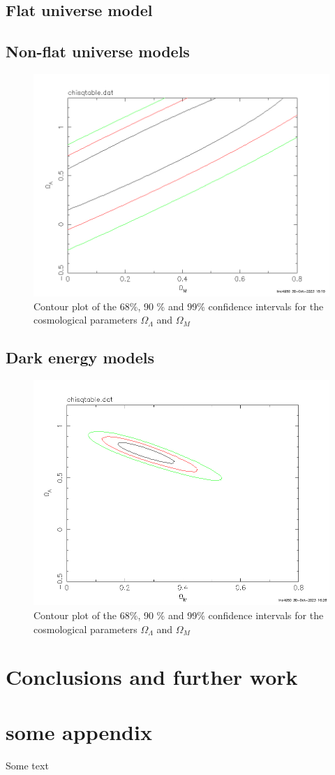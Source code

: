 \documentclass[11pt]{article}
\begin{document}
\subsection{Flat universe model}

\subsection{Non-flat universe models}
\begin{figure}[htbp]
	\centering
	\includegraphics[width=0.8\linewidth]{nonflat.png}
	\caption{Contour plot of the 68\%, 90 \% and 99\% confidence intervals for the cosmological parameters $\Omega_\Lambda$ and $\Omega_M$}
	\label{fig:nonflat}
\end{figure}

\subsection{Dark energy models}
\begin{figure}[htbp]
	\centering
	\includegraphics[width=0.8\linewidth]{dark.png}
	\caption{Contour plot of the 68\%, 90 \% and 99\% confidence intervals for the cosmological parameters $\Omega_\Lambda$ and $\Omega_M$}
	\label{fig:dark}
\end{figure}

\section{Conclusions and further work}




\newpage

\appendix
\section{some appendix} 
Some text
\end{document}
